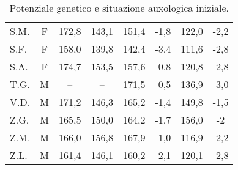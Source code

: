 \begin{table}[!h]
\begin{center}
\begin{tabular}{lccccccc}
S.M.	& F & 172,8 & 143,1 & 151,4 & -1,8 	        	& 122,0 & -2,2  \\
S.F.	& F & 158,0 & 139,8 & 142,4 & -3,4 	  		& 111,6 & -2,8  \\
S.A.	& F & 174,7 & 153,5 & 157,6 & -0,8 	  		& 120,8 & -2,8  \\
T.G.    & M & --    & --    & 171,5 & -0,5    			& 136,9 & -3,0  \\
V.D.	& M & 171,2 & 146,3 & 165,2 & -1,4 	  		& 149,8 & -1,5  \\
Z.G.	& M & 165,5 & 150,0 & 164,2 & -1,7 	  		& 156,0 & -2     \\
Z.M.	& M & 166,0 & 156,8 & 167,9 & -1,0 	  		& 116,9 & -2,2  \\
Z.L.	& M & 161,4 & 146,1 & 160,2 & -2,1 	  		& 120,1 & -2,8  \\
\bottomrule
\end{tabular}
\end{center}
\caption{Potenziale genetico e situazione auxologica iniziale.}
\label{tab:SituazioneIniziale}
\end{table}

